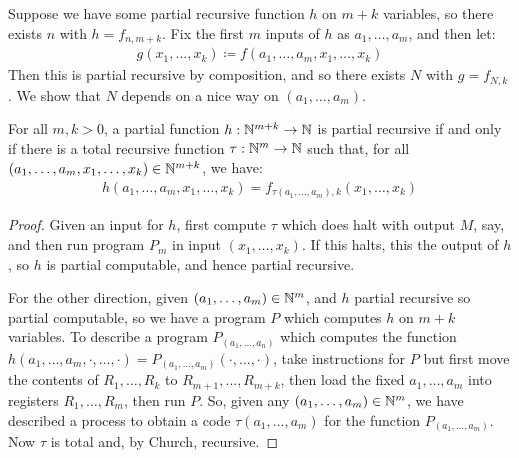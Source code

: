 \documentclass[10pt,a4paper]{article}
\begin{document}
Suppose we have some partial recursive function $h$ on $m+k$ variables, so there exists $n$ with $h= f_{n,m+k}$. Fix the first $m$ inputs of $h$ as $a_1, \ldots, a_m$, and then let:
\begin{align*}
g(x_1, \ldots, x_k) \coloneqq f(a_1, \ldots, a_m, x_1, \ldots, x_k)
\end{align*}
Then this is partial recursive by composition, and so there exists $N$ with $g = f_{N,k}$. We show that $N$ depends on a nice way on $(a_1, \ldots, a_m)$.
\begin{theorem}
For all $m,k > 0$, a partial function $h:\mathbb{N}^{m+k} \to \mathbb{N}$ is partial recursive if and only if there is a total recursive function $\tau:\mathbb{N}^m \to \mathbb{N}$ such that, for all $(a_1, \ldots, a_m, x_1, \ldots, x_k) \in \mathbb{N}^{m+k}$, we have:
\begin{align*}
h(a_1, \ldots, a_m, x_1, \ldots, x_k) = f_{\tau(a_1, \ldots, a_m), k}(x_1, \ldots, x_k)
\end{align*}
\end{theorem}
\begin{proof}
Given an input for $h$, first compute $\tau$ which does halt with output $M$, say, and then run program $P_m$ in input $(x_1, \ldots, x_k)$. If this halts, this the output of $h$, so $h$ is partial computable, and hence partial recursive.

For the other direction, given $(a_1, \ldots, a_m) \in \mathbb{N}^m$, and $h$ partial recursive so partial computable, so we have a program $P$ which computes $h$ on $m+k$ variables. To describe a program $P_{(a_1, \ldots, a_n)}$ which computes the function $h(a_1,\ldots, a_m, \cdot, \ldots, \cdot) = P_{(a_1,\ldots, a_m)}(\cdot, \ldots, \cdot)$, take instructions for $P$ but first move the contents of $R_1, \ldots, R_k$ to $R_{m+1}, \ldots, R_{m+k}$, then load the fixed $a_1, \ldots, a_m$ into registers $R_1, \ldots, R_m$, then run $P$. So, given any $(a_1, \ldots, a_m) \in \mathbb{N}^m$, we have described a process to obtain a code $\tau(a_1, \ldots, a_m)$ for the function $P_{(a_1, \ldots, a_m)}$. Now $\tau$ is total and, by Church, recursive.
\end{proof}
\end{document}
